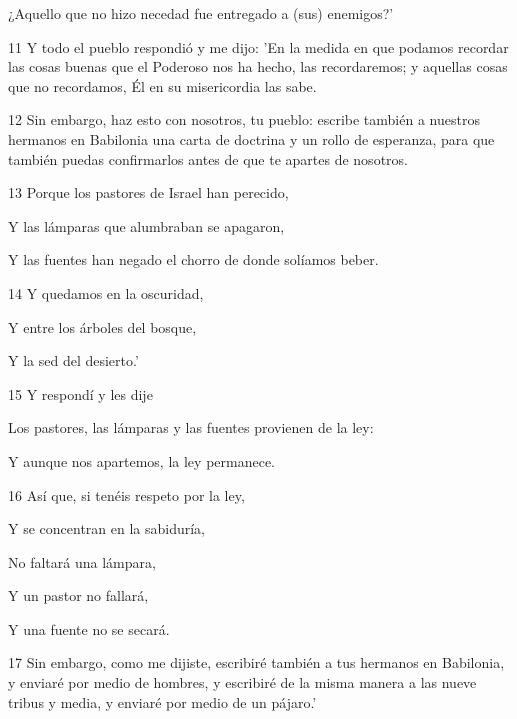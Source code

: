 \par ¿Aquello que no hizo necedad fue entregado a (sus) enemigos?'

\par 11 Y todo el pueblo respondió y me dijo: 'En la medida en que podamos recordar las cosas buenas que el Poderoso nos ha hecho, las recordaremos; y aquellas cosas que no recordamos, Él en su misericordia las sabe.

\par 12 Sin embargo, haz esto con nosotros, tu pueblo: escribe también a nuestros hermanos en Babilonia una carta de doctrina y un rollo de esperanza, para que también puedas confirmarlos antes de que te apartes de nosotros.

\par 13 Porque los pastores de Israel han perecido,

\par Y las lámparas que alumbraban se apagaron,

\par Y las fuentes han negado el chorro de donde solíamos beber.

\par 14 Y quedamos en la oscuridad,

\par Y entre los árboles del bosque,

\par Y la sed del desierto.'

\par 15 Y respondí y les dije

\par Los pastores, las lámparas y las fuentes provienen de la ley:

\par Y aunque nos apartemos, la ley permanece.

\par 16 Así que, si tenéis respeto por la ley,

\par Y se concentran en la sabiduría,

\par No faltará una lámpara,

\par Y un pastor no fallará,

\par Y una fuente no se secará.

\par 17 Sin embargo, como me dijiste, escribiré también a tus hermanos en Babilonia, y enviaré por medio de hombres, y escribiré de la misma manera a las nueve tribus y media, y enviaré por medio de un pájaro.'

